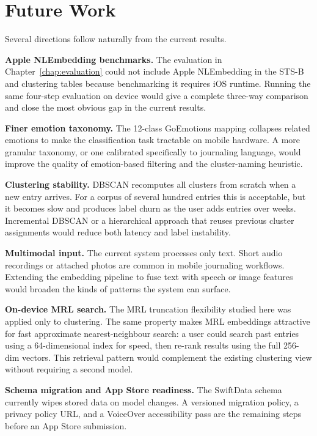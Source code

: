 \section{Future Work}

Several directions follow naturally from the current results.

\textbf{Apple NLEmbedding benchmarks.} The evaluation in Chapter~\ref{chap:evaluation} could not include Apple NLEmbedding in the STS-B and clustering tables because benchmarking it requires iOS runtime. Running the same four-step evaluation on device would give a complete three-way comparison and close the most obvious gap in the current results.

\textbf{Finer emotion taxonomy.} The 12-class GoEmotions mapping collapses related emotions to make the classification task tractable on mobile hardware. A more granular taxonomy, or one calibrated specifically to journaling language, would improve the quality of emotion-based filtering and the cluster-naming heuristic.

\textbf{Clustering stability.} DBSCAN recomputes all clusters from scratch when a new entry arrives. For a corpus of several hundred entries this is acceptable, but it becomes slow and produces label churn as the user adds entries over weeks. Incremental DBSCAN or a hierarchical approach that reuses previous cluster assignments would reduce both latency and label instability.

\textbf{Multimodal input.} The current system processes only text. Short audio recordings or attached photos are common in mobile journaling workflows. Extending the embedding pipeline to fuse text with speech or image features would broaden the kinds of patterns the system can surface.

\textbf{On-device MRL search.} The MRL truncation flexibility studied here was applied only to clustering. The same property makes MRL embeddings attractive for fast approximate nearest-neighbour search: a user could search past entries using a 64-dimensional index for speed, then re-rank results using the full 256-dim vectors. This retrieval pattern would complement the existing clustering view without requiring a second model.

\textbf{Schema migration and App Store readiness.} The SwiftData schema currently wipes stored data on model changes. A versioned migration policy, a privacy policy URL, and a VoiceOver accessibility pass are the remaining steps before an App Store submission.